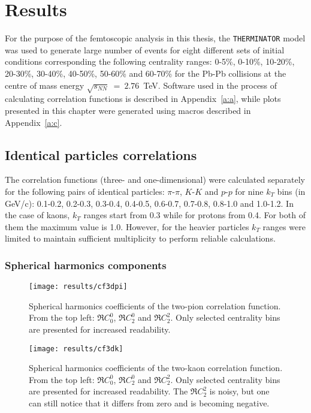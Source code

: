 \chapter{Results}
  For the purpose of the femtoscopic analysis in this thesis, the \verb|THERMINATOR| model was used to generate large number of events for eight different sets of initial conditions corresponding the following centrality ranges: 0-5\%, 0-10\%, 10-20\%, 20-30\%, 30-40\%, 40-50\%, 50-60\% and 60-70\% for the Pb-Pb collisions at the centre of mass energy $\sqrt{s_{NN}}~=~2.76$~TeV.
  Software used in the process of calculating correlation functions is described in Appendix~\ref{a:a}, while plots presented in this chapter were generated using macros described in Appendix~\ref{a:c}.
  \section{Identical particles correlations}
    The correlation functions (three- and one-dimensional) were calculated separately for the following pairs of identical particles: $\pi$-$\pi$, $K$-$K$ and  $p$-$p$ for nine $k_T$ bins (in GeV/c): 0.1-0.2, 0.2-0.3, 0.3-0.4, 0.4-0.5, 0.6-0.7, 0.7-0.8, 0.8-1.0 and 1.0-1.2.
    In the case of kaons, $k_T$ ranges start from 0.3 while for protons from 0.4.
    For both of them the maximum value is 1.0.
    However, for the heavier particles $k_T$ ranges were limited to maintain sufficient multiplicity to perform reliable calculations.
    \subsection{Spherical harmonics components}

      \begin{figure}[b]
        \centering
        \centerline{\texttt{[image: results/cf3dpi]}}
        \caption{Spherical harmonics coefficients of the two-pion correlation function. From the top left: $\Re C^0_0$, $\Re C^0_2$ and $\Re C^2_2$. Only selected centrality bins are presented for increased readability.}
      \label{fig:cf3dpi}
      \end{figure}

      \begin{figure}[b]
        \centering
        \centerline{\texttt{[image: results/cf3dk]}}
        \caption{Spherical harmonics coefficients of the two-kaon correlation function. From the top left: $\Re C^0_0$, $\Re C^0_2$ and $\Re C^2_2$. Only selected centrality bins are presented for increased readability. The $\Re C^2_2$ is noisy, but one can still notice that it differs from zero and is becoming negative.}
      \label{fig:cf3dk}
      \end{figure} 

